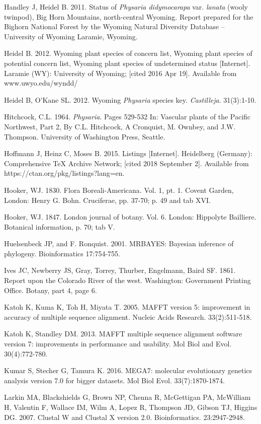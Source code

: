 Handley J, Heidel B. 2011. Status of \textit{Physaria didymocarapa} var. \textit{lanata} (wooly twinpod), Big Horn Mountains, north-central Wyoming. Report prepared for the Bighorn National Forest by the Wyoming Natural Diversity Database – University of Wyoming Laramie, Wyoming.  

Heidel B. 2012. Wyoming plant species of concern list, Wyoming plant species of potential concern list, Wyoming plant species of undetermined status  [Internet]. Laramie (WY): University of Wyoming; [cited 2016 Apr 19]. Available from www.uwyo.edu/wyndd/

Heidel B, O’Kane SL. 2012. Wyoming \textit{Physaria} species key. \textit{Castilleja}. 31(3):1-10.

Hitchcock, C.L. 1964. \textit{Physaria}. Pages 529-532 In: Vascular plants of the Pacific Northwest, Part 2, By C.L. Hitchcock, A Cronquist, M. Ownbey, and J.W. Thompson. University of Washington Press, Seattle.

Hoffmann J, Heinz C, Moses B. 2015. Listings [Internet]. Heidelberg (Germany): Comprehensive TeX Archive Network; [cited 2018 September 2]. Available from https://ctan.org/pkg/listings?lang=en.

Hooker, WJ. 1830. Flora Boreali-Americana. Vol. 1, pt. 1. Covent Garden, London: Henry G. Bohn. Cruciferae, pp. 37-70; p. 49 and tab XVI.

Hooker, WJ. 1847. London journal of botany. Vol. 6. London: Hippolyte Bailliere. Botanical information, p. 70; tab V.  

Huelsenbeck JP, and F. Ronquist. 2001. MRBAYES: Bayesian inference of phylogeny. Bioinformatics 17:754-755.

Ives JC, Newberry JS, Gray, Torrey, Thurber, Engelmann, Baird SF. 1861. Report upon the Colorado River of the west. Washington: Government Printing Office. Botany, part 4, page 6. 

Katoh K, Kuma K, Toh H, Miyata T. 2005. MAFFT version 5: improvement in accuracy of multiple sequence alignment. Nucleic Acids Research. 33(2):511-518.

Katoh K, Standley DM. 2013. MAFFT multiple sequence alignment software version 7: improvements in performance and usability.  Mol Biol and Evol. 30(4):772-780.

Kumar S, Stecher G, Tamura K. 2016. MEGA7: molecular evolutionary genetics analysis version 7.0 for bigger datasets. Mol Biol Evol. 33(7):1870-1874.

Larkin MA, Blackshields G, Brown NP, Chenna R, McGettigan PA, McWilliam H, Valentin F, Wallace IM, Wilm A, Lopez R, Thompson JD, Gibson TJ, Higgins DG. 2007. Clustal W and Clustal X version 2.0. Bioinformatics. 23:2947-2948. 

